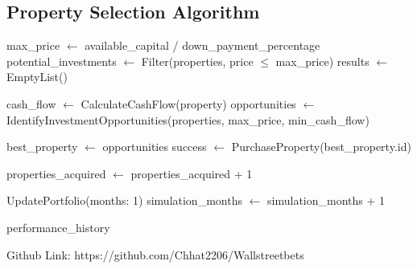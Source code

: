 \documentclass[conference]{IEEEtran}
\begin{document}
\subsection{Property Selection Algorithm}
\begin{algorithmic}[1]
\State max\_price $\gets$ available\_capital / down\_payment\_percentage
\State potential\_investments $\gets$ Filter(properties, price $\leq$ max\_price)
\State results $\gets$ EmptyList()

    \State cash\_flow $\gets$ CalculateCashFlow(property)
            \State opportunities $\gets$ IdentifyInvestmentOpportunities(properties, max\_price, min\_cash\_flow)
            
                \State best\_property $\gets$ opportunities
                \State success $\gets$ PurchaseProperty(best\_property.id)
                
                    \State properties\_acquired $\gets$ properties\_acquired + 1
                \EndIf
            \EndIf
        \EndIf
    \EndIf
    
    \State UpdatePortfolio(months: 1)
    \State simulation\_months $\gets$ simulation\_months + 1
\EndWhile

\State \Return performance\_history
\EndProcedure
\end{algorithmic}

\href{https://github.com/Chhat2206/Wallstreetbets}{\faGitSquare}
Github Link: https://github.com/Chhat2206/Wallstreetbets
\end{document}
